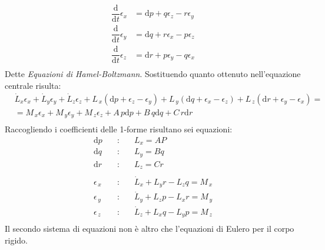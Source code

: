 \documentclass[11pt]{report}
\theoremstyle{plain}
\theoremstyle{definition}
\theoremstyle{remark}
\begin{document}
\begin{equation}\label{eq:hamelboltzman}\begin{split}
\dfrac{\textrm{d}}{\textrm{d}t} \epsilon_{x} & = \textrm{d}p + q\epsilon_{z} - r\epsilon_{y}\\
\dfrac{\textrm{d}}{\textrm{d}t} \epsilon_{y} & = \textrm{d}q + r\epsilon_{x} - p\epsilon_{z}\\
\dfrac{\textrm{d}}{\textrm{d}t} \epsilon_{z} & = \textrm{d}r + p\epsilon_{y} - q\epsilon_{x}\\
\end{split}\end{equation}
Dette \emph{Equazioni di Hamel-Boltzmann}.
Sostituendo quanto ottenuto nell'equazione centrale risulta:
\begin{displaymath}\begin{split}
&\dot{L}_{x} \epsilon_{x} + 
\dot{L}_{y} \epsilon_{y} + 
\dot{L}_{z} \epsilon_{z} + 
L_{\,x} ( \textrm{d} p + \epsilon_{z} - \epsilon_{y}) + 
L_{\,y} ( \textrm{d} q + \epsilon_{x} - \epsilon_{z}) + 
L_{\,z} ( \textrm{d} r + \epsilon_{y} - \epsilon_{x}) = \\&=  
M_{\, x}\epsilon_{x} + 
M_{\, y}\epsilon_{y} + 
M_{\, z}\epsilon_{z} + 
A \, p\textrm{d}p +
B \, q\textrm{d}q +
C \, r\textrm{d}r \\
\end{split}\end{displaymath}
Raccogliendo i coefficienti delle 1-forme risultano sei equazioni:
\begin{equation}\label{eq:hamelboltzmancorporigido}
\begin{array}{lcr}
\textrm{d}p & \quad : \quad & L_{x} = A P \\
\textrm{d}q & \quad : \quad & L_{y} = B q \\
\textrm{d}r & \quad : \quad & L_{z} = C r \\
 & & \\
\epsilon_{\, x} & \quad : \quad & \dot{L}_{x} + L_{y}r - L_{z}q = M_{\, x} \\
\epsilon_{\, y} & \quad : \quad & \dot{L}_{y} + L_{z}p - L_{x}r = M_{\, y} \\
\epsilon_{\, z} & \quad : \quad & \dot{L}_{z} + L_{x}q - L_{y}p = M_{\, z} \\
\end{array}
\end{equation}
Il secondo sistema di equazioni non è altro che l'equazioni di Eulero per il corpo rigido.
\end{document}
